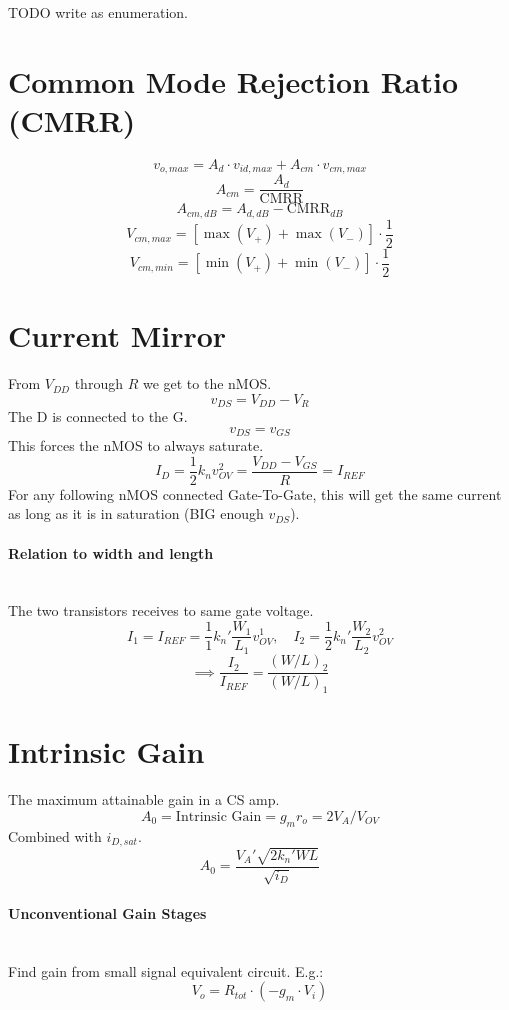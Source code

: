 \documentclass[twocolumn]{article}
\begin{document}
      TODO write as enumeration.

  \section{Common Mode Rejection Ratio (CMRR)}
    $$v_{o,max} = A_d \cdot v_{id,max} + A_{cm} \cdot v_{cm,max}$$
    $$A_{cm} = \frac{A_d}{\text{CMRR}}$$
    $$A_{cm,dB} = A_{d,dB} - \text{CMRR}_{dB}$$
    $$V_{cm,max} = \left[\max(V_+) + \max(V_-) \right] \cdot \frac{1}{2}$$
    $$V_{cm,min} = \left[\min(V_+) + \min(V_-) \right] \cdot \frac{1}{2}$$

  \section{Current Mirror}
    From $V_{DD}$ through $R$ we get to the nMOS.
    $$v_{DS} = V_{DD} - V_R$$
    The D is connected to the G.
    $$v_{DS} = v_{GS}$$
    This forces the nMOS to always saturate.
    $$I_D = \frac{1}{2} k_n v_{OV}^2 = \frac{V_{DD} - V_{GS}}{R} = I_{REF}$$
    For any following nMOS connected Gate-To-Gate, this will get the same
    current as long as it is in saturation (BIG enough $v_{DS}$).

    \paragraph{Relation to width and length} \hfill \\
    The two transistors receives to same gate voltage.
    $$I_1 = I_{REF} = \frac{1}{1} k_n' \frac{W_1}{L_1} v_{OV}^1
      ,\quad
      I_2 = \frac{1}{2} k_n' \frac{W_2}{L_2} v_{OV}^2
      $$
    $$\implies \frac{I_2}{I_{REF}} = \frac{(W/L)_2}{(W/L)_1}$$

  \section{Intrinsic Gain}
    The maximum attainable gain in a CS amp.
    $$A_0 = \text{Intrinsic Gain} = g_m r_o = 2V_A / V_{OV}$$
    Combined with $i_{D,sat}$.
    $$A_0 = \frac{V_A' \sqrt{2 k_n' WL}}{\sqrt{i_D}}$$

    \paragraph{Unconventional Gain Stages} \hfill \\
    Find gain from small signal equivalent circuit.
    E.g.:
    $$V_o = R_{tot} \cdot (-g_m \cdot V_i)$$
\end{document}

